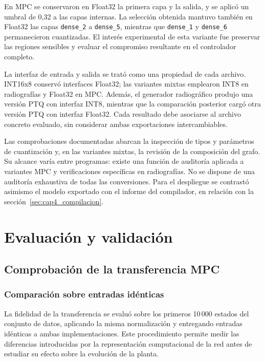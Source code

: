 En MPC se conservaron en Float32 la primera capa y la salida, y se aplicó un umbral de 0,32 a las capas internas. La selección obtenida mantuvo también en Float32 las capas \texttt{dense\_2} a \texttt{dense\_5}, mientras que \texttt{dense\_1} y \texttt{dense\_6} permanecieron cuantizadas. El interés experimental de esta variante fue preservar las regiones sensibles y evaluar el compromiso resultante en el controlador completo.

La interfaz de entrada y salida se trató como una propiedad de cada archivo. INT16x8 conservó interfaces Float32; las variantes mixtas emplearon INT8 en radiografías y Float32 en MPC. Además, el generador radiográfico produjo una versión PTQ con interfaz INT8, mientras que la comparación posterior cargó otra versión PTQ con interfaz Float32. Cada resultado debe asociarse al archivo concreto evaluado, sin considerar ambas exportaciones intercambiables.

Las comprobaciones documentadas abarcan la inspección de tipos y parámetros de cuantización y, en las variantes mixtas, la revisión de la composición del grafo. Su alcance varía entre programas: existe una función de auditoría aplicada a variantes MPC y verificaciones específicas en radiografías. No se dispone de una auditoría exhaustiva de todas las conversiones. Para el despliegue se contrastó asimismo el modelo exportado con el informe del compilador, en relación con la sección~\ref{sec:cap4_compilacion}.

\section{Evaluación y validación}
\label{sec:evaluacion_validacion}

\subsection{Comprobación de la transferencia MPC}\label{sec:comparacion_transferencia}
\subsubsection{Comparación sobre entradas idénticas}
La fidelidad de la transferencia se evaluó sobre los primeros 10\,000 estados del conjunto de datos, aplicando la misma normalización y entregando entradas idénticas a ambas implementaciones. Este procedimiento permite medir las diferencias introducidas por la representación computacional de la red antes de estudiar su efecto sobre la evolución de la planta.

